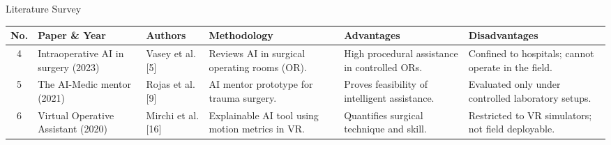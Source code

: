 \documentclass[aspectratio=169, 10pt]{beamer}
\begin{document}
\begin{frame}{Literature Survey}
    \vspace{0.15cm}
    \scriptsize
    \setlength{\tabcolsep}{3pt}
    \renewcommand{\arraystretch}{1.12}
    \begin{tabularx}{\textwidth}{|c|>{\raggedright\arraybackslash}p{2.3cm}|>{\raggedright\arraybackslash}p{1.5cm}|>{\raggedright\arraybackslash}X|>{\raggedright\arraybackslash}X|>{\raggedright\arraybackslash}X|}
        \hline
        \textbf{No.} & \textbf{Paper \& Year} & \textbf{Authors} & \textbf{Methodology} & \textbf{Advantages} & \textbf{Disadvantages} \\
        \hline
        4 & Intraoperative AI in surgery (2023) & Vasey et al. [5] & Reviews AI in surgical operating rooms (OR). & High procedural assistance in controlled ORs. & Confined to hospitals; cannot operate in the field. \\
        \hline
        5 & The AI-Medic mentor (2021) & Rojas et al. [9] & AI mentor prototype for trauma surgery. & Proves feasibility of intelligent assistance. & Evaluated only under controlled laboratory setups. \\
        \hline
        6 & Virtual Operative Assistant (2020) & Mirchi et al. [16] & Explainable AI tool using motion metrics in VR. & Quantifies surgical technique and skill. & Restricted to VR simulators; not field deployable. \\
        \hline
    \end{tabularx}
\end{frame}
\end{document}
